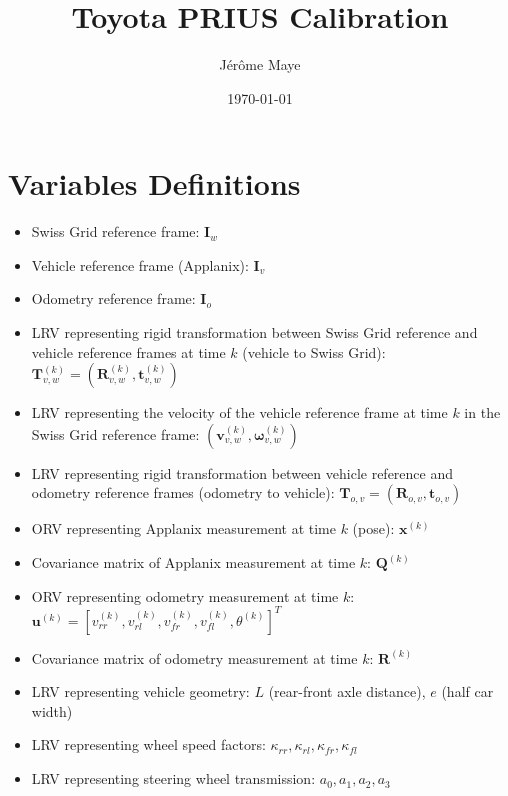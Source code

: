 \documentclass[12pt]{article}
\title{Toyota PRIUS Calibration}
\author{J\'{e}r\^{o}me Maye}
\date{\today}
\begin{document}
  \maketitle

  \section{Variables Definitions}\label{sec:model}
    \begin{itemize}
      \item Swiss Grid reference frame: $\mathbf{I}_w$
      \item Vehicle reference frame (Applanix): $\mathbf{I}_v$
      \item Odometry reference frame: $\mathbf{I}_o$
      \item LRV representing rigid transformation between Swiss Grid reference
        and vehicle reference frames at time $k$ (vehicle to Swiss Grid):
        $\mathbf{T}_{v,w}^{(k)}=(\mathbf{R}_{v,w}^{(k)},\mathbf{t}_{v,w}^{(k)})$
      \item LRV representing the velocity of the vehicle reference frame at time
        $k$ in the Swiss Grid reference frame:
        $(\mathbf{v}_{v,w}^{(k)},\boldsymbol{\omega}_{v,w}^{(k)})$
      \item LRV representing rigid transformation between vehicle reference and
        odometry reference frames (odometry to vehicle):
        $\mathbf{T}_{o,v}=(\mathbf{R}_{o,v},\mathbf{t}_{o,v})$
      \item ORV representing Applanix measurement at time $k$
        (pose): $\mathbf{x}^{(k)}$
      \item Covariance matrix of Applanix measurement at time $k$:
        $\mathbf{Q}^{(k)}$
      \item ORV representing odometry measurement at time $k$:
        $\mathbf{u}^{(k)}=[v_{rr}^{(k)},v_{rl}^{(k)},v_{fr}^{(k)},v_{fl}^{(k)},
        \theta^{(k)}]^T$
      \item Covariance matrix of odometry measurement at time $k$:
        $\mathbf{R}^{(k)}$
      \item LRV representing vehicle geometry: $L$ (rear-front axle distance),
        $e$ (half car width)
      \item LRV representing wheel speed factors: $\kappa_{rr},\kappa_{rl},
        \kappa_{fr},\kappa_{fl}$
      \item LRV representing steering wheel transmission: $a_0,a_1,a_2,a_3$
    \end{itemize}
\end{document}
